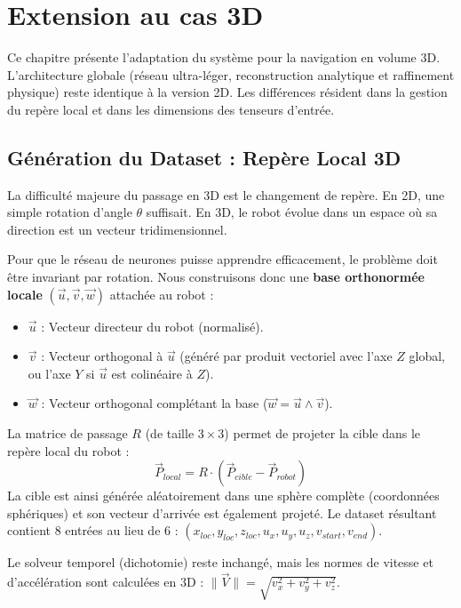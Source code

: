 \documentclass[12pt]{report}
\theoremstyle{plain}
\begin{document}
\chapter{Extension au cas 3D}
\label{sec:poc_3d}

Ce chapitre présente l'adaptation du système pour la navigation en volume 3D. L'architecture globale (réseau ultra-léger, reconstruction analytique et raffinement physique) reste identique à la version 2D. Les différences résident dans la gestion du repère local et dans les dimensions des tenseurs d'entrée.

\section{Génération du Dataset : Repère Local 3D}

La difficulté majeure du passage en 3D est le changement de repère. En 2D, une simple rotation d'angle \(\theta\) suffisait. En 3D, le robot évolue dans un espace où sa direction est un vecteur tridimensionnel. 

Pour que le réseau de neurones puisse apprendre efficacement, le problème doit être invariant par rotation. Nous construisons donc une \textbf{base orthonormée locale} \((\vec{u}, \vec{v}, \vec{w})\) attachée au robot :
\begin{itemize}
    \item \(\vec{u}\) : Vecteur directeur du robot (normalisé).
    \item \(\vec{v}\) : Vecteur orthogonal à \(\vec{u}\) (généré par produit vectoriel avec l'axe \(Z\) global, ou l'axe \(Y\) si \(\vec{u}\) est colinéaire à \(Z\)).
    \item \(\vec{w}\) : Vecteur orthogonal complétant la base (\(\vec{w} = \vec{u} \wedge \vec{v}\)).
\end{itemize}

La matrice de passage \(R\) (de taille \(3 \times 3\)) permet de projeter la cible dans le repère local du robot :
\[ \vec{P}_{local} = R \cdot (\vec{P}_{cible} - \vec{P}_{robot}) \]
La cible est ainsi générée aléatoirement dans une sphère complète (coordonnées sphériques) et son vecteur d'arrivée est également projeté. Le dataset résultant contient 8 entrées au lieu de 6 : \((x_{loc}, y_{loc}, z_{loc}, u_x, u_y, u_z, v_{start}, v_{end})\).

Le solveur temporel (dichotomie) reste inchangé, mais les normes de vitesse et d'accélération sont calculées en 3D : \(\|\vec{V}\| = \sqrt{v_x^2 + v_y^2 + v_z^2}\).
\end{document}
